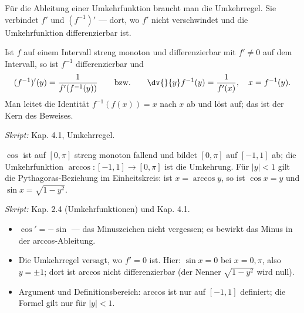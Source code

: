 

Für die Ableitung einer Umkehrfunktion braucht man die Umkehrregel. Sie
verbindet $f'$ und $(f^{-1})'$ — dort, wo $f'$ nicht verschwindet und die
Umkehrfunktion differenzierbar ist.

\begin{werkzeugkasten}[Umkehrregel]
Ist $f$ auf einem Intervall streng monoton und differenzierbar mit $f'\neq0$
auf dem Intervall, so ist $f^{-1}$ differenzierbar und
\begin{equation}
  (f^{-1})'(y)=\frac{1}{f'(f^{-1}(y))}
  \qquad\text{bzw.}\qquad
  \dv{}{y}f^{-1}(y)=\frac{1}{f'(x)},\quad x=f^{-1}(y).
\end{equation}
Man leitet die Identität $f^{-1}(f(x))=x$ nach $x$ ab und löst auf; das ist
der Kern des Beweises.

\textit{Skript:} Kap. 4.1, Umkehrregel.
\end{werkzeugkasten}

\begin{werkzeugkasten}
$\cos$ ist auf $[0,\pi]$ streng monoton fallend und bildet $[0,\pi]$ auf
$[-1,1]$ ab; die Umkehrfunktion
$\arccos:[-1,1]\to[0,\pi]$ ist die Umkehrung. Für $|y|<1$ gilt die
Pythagoras-Beziehung im Einheitskreis: ist $x=\arccos y$, so ist $\cos x=y$
und $\sin x=\sqrt{1-y^2}$.

\textit{Skript:} Kap. 2.4 (Umkehrfunktionen) und Kap. 4.1.
\end{werkzeugkasten}

\begin{achtung}
\begin{itemize}
  \item $\cos'=-\sin$ — das Minuszeichen nicht vergessen; es bewirkt das
        Minus in der arccos-Ableitung.
  \item Die Umkehrregel versagt, wo $f'=0$ ist. Hier: $\sin x=0$ bei
        $x=0,\pi$, also $y=\pm1$; dort ist arccos nicht differenzierbar
        (der Nenner $\sqrt{1-y^2}$ wird null).
  \item Argument und Definitionsbereich: arccos ist nur auf $[-1,1]$ definiert;
        die Formel gilt nur für $|y|<1$.
\end{itemize}
\end{achtung}
